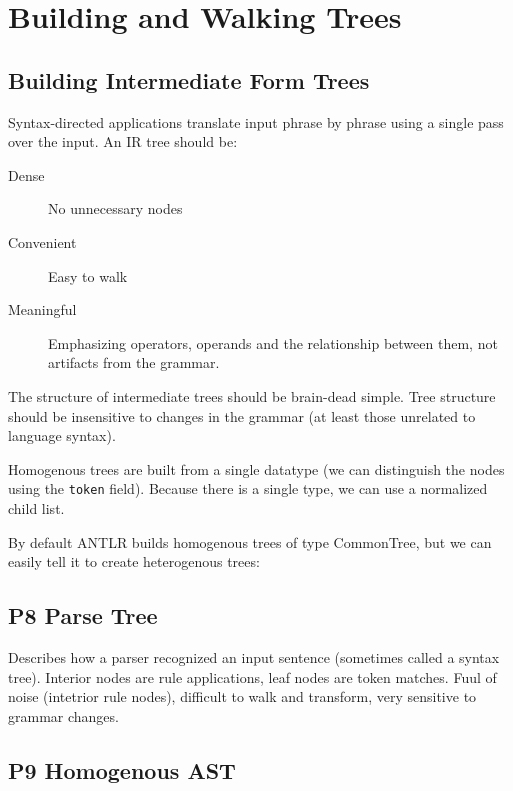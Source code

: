 \section{Building and Walking Trees}


\subsection{Building Intermediate Form Trees}

Syntax-directed applications translate input phrase by phrase
using a single pass over the input.
An IR tree should be:
\begin{description}
\item[Dense] No unnecessary nodes
\item[Convenient] Easy to walk
\item[Meaningful]
Emphasizing operators, operands and the relationship between them,
not artifacts from the grammar.
\end{description}

The structure of intermediate trees should be brain-dead simple.
Tree structure should be insensitive to changes in the grammar
(at least those unrelated to language syntax).

Homogenous trees are built from a single datatype
(we can distinguish the nodes using the \verb=token= field).
Because there is a single type, we can use a normalized child list.


By default ANTLR builds homogenous trees of type CommonTree,
but we can easily tell it to create heterogenous trees:



\subsection{P8 Parse Tree}

Describes how a parser recognized an input sentence
(sometimes called a syntax tree).
Interior nodes are rule applications, leaf nodes are token matches.
Fuul of noise (intetrior rule nodes), difficult to walk and transform,
very sensitive to grammar changes.


\subsection{P9 Homogenous AST}

